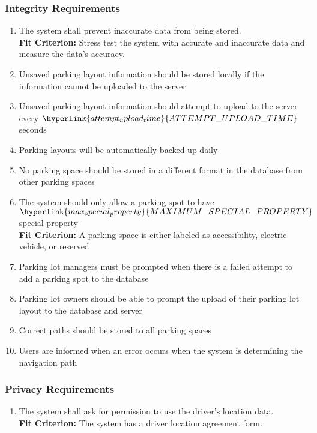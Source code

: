 \documentclass[12pt,letterpaper]{article}
\begin{document}
\subsubsection{Integrity Requirements}
\begin{enumerate}[resume*] 
    \item The system shall prevent inaccurate data from being stored.\\
    \textbf{Fit Criterion:} Stress test the system with accurate and inaccurate
    data and measure the data's accuracy.
    \item Unsaved parking layout information should be stored locally if the
    information cannot be uploaded to the server \label{isr5}
    \item Unsaved parking layout information should attempt to upload to the
    server every $\hyperlink{attempt_upload_time}{ATTEMPT\_UPLOAD\_TIME}$
    seconds \label{isr6}
    \item Parking layouts will be automatically backed up daily \label{isr7}
    \item No parking space should be stored in a different format in the
    database from other parking spaces \label{isr8}
    \item The system should only allow a parking spot to have
    $\hyperlink{max_special_property}{MAXIMUM\_SPECIAL\_PROPERTY}$ special
    property \label{isr9}\\
    \textbf{Fit Criterion:} A parking space is either labeled as accessibility,
    electric vehicle, or reserved
    \item Parking lot managers must be prompted when there is a failed attempt
    to add a parking spot to the database \label{isr10}
    \item Parking lot owners should be able to prompt the upload of their
    parking lot layout to the database and server \label{isr11}
    \item Correct paths should be stored to all parking spaces \label{isr12}
    \item Users are informed when an error occurs when the system is determining
    the navigation path \label{isr13}
\end{enumerate}

\subsubsection{Privacy Requirements}
\begin{enumerate}[resume*] 
    \item The system shall ask for permission to use the driver's location
    data.\\
    \textbf{Fit Criterion:} The system has a driver location agreement form.
\end{enumerate}
\end{document}

